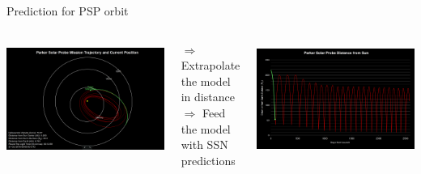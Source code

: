 \begin{frame}[plain,c]{Prediction for PSP orbit}{}
	\begin{columns}[t]	%
	
		\hspace*{-22pt}
		\includegraphics[height=0.9\textwidth]{../talk_figures/psp201810_0730_top.png}
		
		$\Rightarrow$ Extrapolate the model in distance\\
		$\Rightarrow$ Feed the model with SSN predictions

	
		\hspace*{-10pt}
		\includegraphics[height=0.9\textwidth]{../talk_figures/psp201810_0730_bottom.png}
		

\end{columns}
\end{frame}
